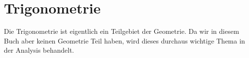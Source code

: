 
\chapter{Trigonometrie}

Die Trigonometrie ist eigentlich ein Teilgebiet der Geometrie. Da wir in diesem Buch aber keinen Geometrie Teil haben, wird dieses durchaus wichtige Thema in der Analysis behandelt. 